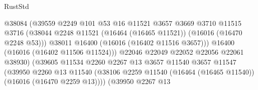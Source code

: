 \begin{lexlean}{RustStd}
\begin{coremodule}
                                            @38084
                                            (@39559
                                              @2249
                                              @101
                                              @53
                                              @16
                                              @11521
                                              @3657
                                              @3669
                                              @3710
                                              @11515
                                              @3716
                                              (@38044
                                                @2248
                                                @11521
                                                (@16464 (@16465 @11521))
                                                (@16016 (@16470 @2248 @53)))
                                              @38011
                                              @16400
                                              (@16016 (@16402 @11516 @3657)))
                                            @16400
                                            (@16016 (@16402 @11506 @11524)))
                                          @22046
                                          @22049
                                          @22052
                                          @22056
                                          @22061
                                          @38930)
                                        (@39605
                                          @11534
                                          @2260
                                          @2267
                                          @13
                                          @3657
                                          @11540
                                          @3657
                                          @11547
                                          (@39950
                                            @2260
                                            @13
                                            @11540
                                            (@38106
                                              @2259
                                              @11540
                                              (@16464 (@16465 @11540))
                                              (@16016 (@16470 @2259 @13))))
                                          (@39950
                                            @2267
                                            @13

\end{coremodule}
\end{lexlean}
